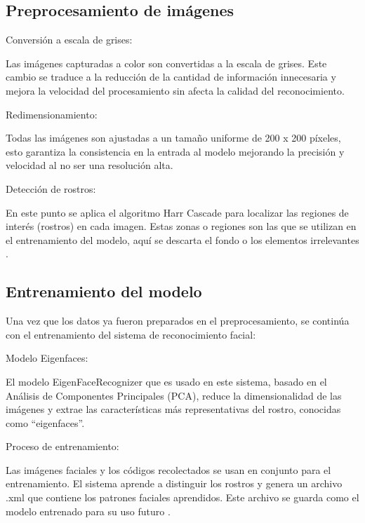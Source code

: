 \documentclass[12pt]{article}
\begin{document}
{\begin{itemize}
\end{itemize}


\subsection{Preprocesamiento de imágenes}
\begin{itemize}
	{\bfseries\item Conversión a escala de grises:} Las imágenes capturadas a color son convertidas a la escala de grises. Este cambio se traduce a la reducción de la cantidad de información innecesaria y mejora la velocidad del procesamiento sin afecta la calidad del reconocimiento.
	{\bfseries\item Redimensionamiento:} Todas las imágenes son ajustadas a un tamaño uniforme de 200 x 200 píxeles, esto garantiza la consistencia en la entrada al modelo mejorando la precisión y velocidad al no ser una resolución alta.
	{\bfseries\item Detección de rostros:} En este punto se aplica el algoritmo Harr Cascade para localizar las regiones de interés (rostros) en cada imagen. Estas zonas o regiones son las que se utilizan en el entrenamiento del modelo, aquí se descarta el fondo o los elementos irrelevantes \cite{khan2019face}.
\end{itemize}

\subsection{Entrenamiento del modelo}
Una vez que los datos ya fueron preparados en el preprocesamiento, se continúa con el entrenamiento del sistema de reconocimiento facial:
\begin{itemize}
	{\bfseries\item Modelo Eigenfaces:} El modelo EigenFaceRecognizer que es usado en este sistema, basado en el Análisis de Componentes Principales (PCA), reduce la dimensionalidad de las imágenes y extrae las características más representativas del rostro, conocidas como “eigenfaces”.
	{\bfseries\item Proceso de entrenamiento:} Las imágenes faciales y los códigos recolectados se usan en conjunto para el entrenamiento. El sistema aprende a distinguir los rostros y genera un archivo .xml que contiene los patrones faciales aprendidos. Este archivo se guarda como el modelo entrenado para su uso futuro \cite{ardila2022implementacion}.
\end{itemize}

}
\end{document}

